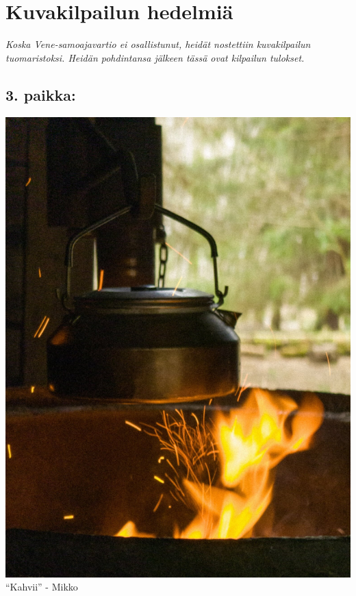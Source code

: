 
\section{Kuvakilpailun hedelmiä}

\textit{Koska \textit{Vene}-samoajavartio ei osallistunut, heidät nostettiin kuvakilpailun tuomaristoksi. Heidän pohdintansa jälkeen tässä ovat kilpailun tulokset.}

\vspace{0.64cm}

\begin{multicols}{2}

	\subsection*{3. paikka:}
\begin{center}
	\noindent\includegraphics[height=0.9\linewidth]{assets/kuvakilpailu3}\\
	``Kahvii'' - Mikko%
\end{center}

\columnbreak


\end{multicols}
